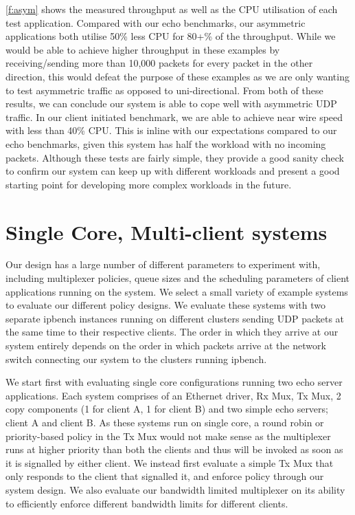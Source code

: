 \autoref{f:asym} shows the measured throughput as well as the CPU utilisation of each test application. 
Compared with our echo benchmarks, our asymmetric applications both utilise 50\% less CPU for 80+\% of the
throughput. While we would be able to achieve higher throughput in these examples by receiving/sending
more than 10,000 packets for every packet in the other direction, this would defeat the purpose of these examples
as we are only wanting to test asymmetric traffic as opposed to uni-directional.
From both of these results, we can conclude our system is able to cope well with asymmetric UDP traffic. 
In our client initiated benchmark, we are able to achieve near wire speed with less than 40\% CPU. This is inline
with our expectations compared to our echo benchmarks, given this system has half the workload with no incoming
packets. Although these tests are fairly simple, they provide a good sanity check to confirm our system can 
keep up with different workloads and present a good starting point for developing more complex workloads in the future.

\section{Single Core, Multi-client systems}

Our design has a large number of different parameters to experiment with, including multiplexer
policies, queue sizes and the scheduling parameters of client applications running on the system. 
We select a small variety of example systems to evaluate our different policy designs. We evaluate
these systems with two separate ipbench instances running on different clusters sending UDP packets
at the same time to their respective clients. The order in which they arrive at our system entirely
depends on the order in which packets arrive at the network switch connecting our system to the clusters
running ipbench. 

We start first with evaluating single core configurations running two echo server applications. 
Each system comprises of an Ethernet driver, Rx Mux, Tx Mux, 2 copy components (1 for client A, 1 for client B) 
and two simple echo servers; client A and client B. As these systems run on single core, a round robin or priority-based
policy in the Tx Mux would not make sense as the multiplexer runs at higher priority than both the clients and thus
will be invoked as soon as it is signalled by either client. We instead first evaluate a simple Tx Mux that only 
responds to the client that signalled it, and enforce policy through our system design. We also evaluate our
bandwidth limited multiplexer on its ability to efficiently enforce different bandwidth limits for different clients.

